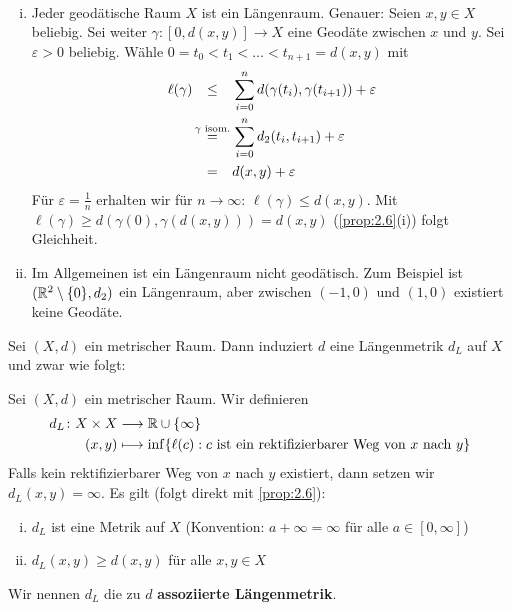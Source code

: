 \begin{beispiel}
\label{bsp:2.8}
	\mbox{} \\[-1.4cm]
	\begin{enumerate}[(i)]
		\item Jeder geodätische Raum $X$ ist ein Längenraum.
		Genauer:
		Seien $x,y \in X$ beliebig.
		Sei weiter $\gamma\colon [0,d(x,y)] \rightarrow X$ eine Geodäte zwischen $x$ und $y$.
		Sei $\varepsilon > 0$ beliebig.
		Wähle $0 = t_0 < t_1 < \dots < t_{n+1} = d(x,y)$ mit
		\begin{align*}
			\ell(\gamma) &\stack{}{\leq} \sum\limits_{i=0}^{n} d(\gamma(t_i),\gamma(t_{i+1})) + \varepsilon \\
			&\stack{\gamma\text{ isom.}}{=} \sum\limits_{i=0}^{n} d_2(t_i,t_{i+1}) + \varepsilon \\
			&\stack{}{=} d(x,y) + \varepsilon
		\end{align*}
		Für $\varepsilon = \frac{1}{n}$ erhalten wir für $n \rightarrow \infty$: $\ell(\gamma) \leq d(x,y)$. Mit $\ell(\gamma) \geq d(\gamma(0),\gamma(d(x,y))) = d(x,y)$ (\autoref{prop:2.6}(i)) folgt Gleichheit.
		\item Im Allgemeinen ist ein Längenraum nicht geodätisch.
		Zum Beispiel ist $(\mathbb{R}^2 \setminus \{0\},d_2)$ ein Längenraum, aber zwischen $(-1,0)$ und $(1,0)$ existiert keine Geodäte.
	\end{enumerate}
\end{beispiel}

Sei $(X,d)$ ein metrischer Raum.
Dann induziert $d$ eine Längenmetrik $d_L$ auf $X$ und zwar wie folgt:

\begin{definition}
\label{def:2.9}
	Sei $(X,d)$ ein metrischer Raum.
	Wir definieren
	\begin{align*}
		d_L \colon X \times X &\longrightarrow \mathbb{R} \cup \{\infty\} \\
		(x,y) &\longmapsto \inf\{ \ell(c) : c \text{ ist ein rektifizierbarer Weg von } x \text{ nach } y\}
	\end{align*}	
	Falls kein rektifizierbarer Weg von $x$ nach $y$ existiert, dann setzen wir $d_L(x,y) = \infty$.
	Es gilt (folgt direkt mit \autoref{prop:2.6}):
	\begin{enumerate}[(i)]
		\item $d_L$ ist eine Metrik auf $X$ (Konvention: $a + \infty = \infty$ für alle $a \in [0,\infty]$)
		\item $d_L(x,y) \geq d(x,y)$ für alle $x,y \in X$
	\end{enumerate}
	Wir nennen $d_L$ die zu $d$ \textbf{assoziierte Längenmetrik}. 
\end{definition}

